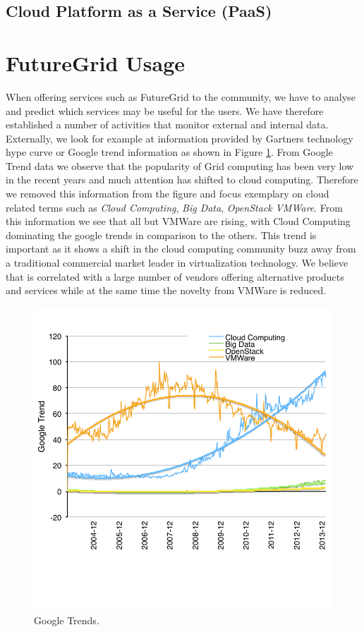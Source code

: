 \documentclass{article}
\newcommand{\FILE}[1]{\todo[color=green!40]{#1}}
\begin{document}
\subsection{Cloud Platform as a Service (PaaS)}




\FILE{usage.tex}

\section{FutureGrid Usage}

When offering services such as FutureGrid to the community, we have to
analyse and predict which services may be useful for the users. We
have therefore established a number of activities that monitor
external and internal data. Externally, we look for example at
information provided by Gartners technology hype curve \cite{?} or
Google trend information as shown in Figure \ref{F:google-trend}. From
Google Trend data we observe that the popularity of Grid computing
has been very low  in the recent years and much attention has shifted
to cloud computing. Therefore we removed this information from the
figure and focus exemplary on cloud related terms such as {\em Cloud
  Computing}, {\em Big Data}, {\em OpenStack} {\em VMWare}.
From this information we see that all but VMWare are rising, with
Cloud Computing dominating the google trends in comparison to the
others. This trend is important as it shows a shift in the cloud
computing community buzz away from a traditional commercial market
leader in virtualization technology. We believe that is correlated
with a large number of vendors offering alternative products and
services while at the same time the novelty from VMWare is reduced.

\begin{figure}[htb]
 \centering
    \includegraphics[width=.75\textwidth]{images/google-trend.pdf}
  \caption{Google Trends.}\label{F:google-trend}
\end{figure}
\end{document}
